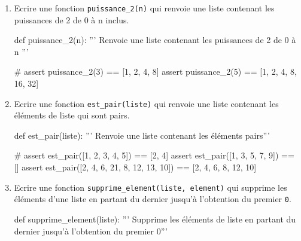 \begin{exercice_cours}{}

	\begin{enumerate}
		\item Ecrire une fonction \texttt{puissance\_2(n)} qui renvoie une liste contenant les puissances de 2 de 0 à n inclus.
		\begin{CodePythontexAlt}[TaillePolice=\normalsize, Largeur=1\linewidth,Centre,PremLigne=1, Lignes=false,]{}
				def puissance_2(n):
					''' Renvoie une liste contenant les puissances de 2 de 0 à n '''










					#
				assert puissance_2(3) == [1, 2, 4, 8]
				assert puissance_2(5) == [1, 2, 4, 8, 16, 32]
				\end{CodePythontexAlt}

		\item Ecrire une fonction \texttt{est\_pair(liste)} qui renvoie une liste contenant les éléments de liste qui sont pairs.
		\begin{CodePythontexAlt}[TaillePolice=\normalsize, Largeur=1\linewidth,Centre,PremLigne=1, Lignes=false,]{}
				def est_pair(liste):
					''' Renvoie une liste contenant les éléments pairs'''










					#
				assert est_pair([1, 2, 3, 4, 5]) == [2, 4]
				assert est_pair([1, 3, 5, 7, 9]) == []
				assert est_pair([2, 4, 6, 21, 8, 12, 13, 10]) == [2, 4, 6, 8, 12, 10]
				\end{CodePythontexAlt}

				\pagebreak

		\item Ecrire une fonction \texttt{supprime\_element(liste, element)} qui supprime les éléments d'une liste en partant du dernier jusqu'à l'obtention du premier \verb|0|.
		
		\begin{CodePythontexAlt}[TaillePolice=\normalsize, Largeur=1\linewidth,Centre,PremLigne=1, Lignes=false,]{}
				def supprime_element(liste):
					''' Supprime les éléments de liste en partant du dernier 
					jusqu'à l'obtention du premier 0'''










\end{CodePythontexAlt}
\end{enumerate}
\end{exercice_cours}
